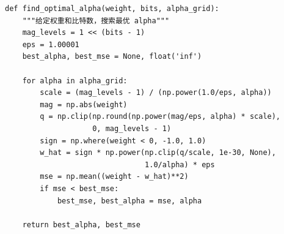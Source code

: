 \documentclass[11pt,a4paper]{article}
\begin{document}
\begin{verbatim}
def find_optimal_alpha(weight, bits, alpha_grid):
    """给定权重和比特数，搜索最优 alpha"""
    mag_levels = 1 << (bits - 1)
    eps = 1.00001
    best_alpha, best_mse = None, float('inf')
    
    for alpha in alpha_grid:
        scale = (mag_levels - 1) / (np.power(1.0/eps, alpha))
        mag = np.abs(weight)
        q = np.clip(np.round(np.power(mag/eps, alpha) * scale), 
                    0, mag_levels - 1)
        sign = np.where(weight < 0, -1.0, 1.0)
        w_hat = sign * np.power(np.clip(q/scale, 1e-30, None), 
                                1.0/alpha) * eps
        mse = np.mean((weight - w_hat)**2)
        if mse < best_mse:
            best_mse, best_alpha = mse, alpha
    
    return best_alpha, best_mse
\end{verbatim}
\end{document}
